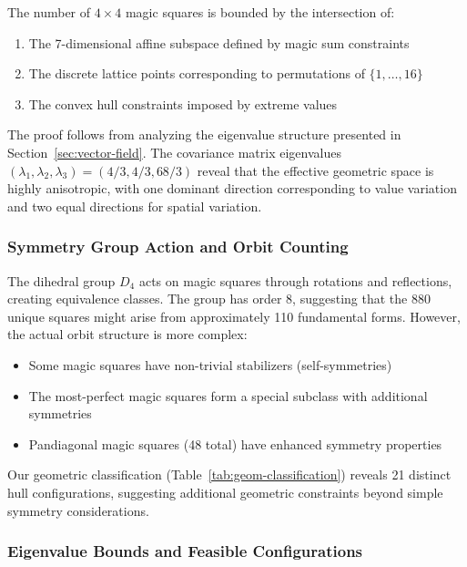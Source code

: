 \begin{theorem}
The number of $4 \times 4$ magic squares is bounded by the intersection of:
\begin{enumerate}
    \item The 7-dimensional affine subspace defined by magic sum constraints
    \item The discrete lattice points corresponding to permutations of $\{1, \ldots, 16\}$
    \item The convex hull constraints imposed by extreme values
\end{enumerate}
\end{theorem}

The proof follows from analyzing the eigenvalue structure presented in Section~\ref{sec:vector-field}. The covariance matrix eigenvalues $(\lambda_1, \lambda_2, \lambda_3) = (4/3, 4/3, 68/3)$ reveal that the effective geometric space is highly anisotropic, with one dominant direction corresponding to value variation and two equal directions for spatial variation.

\subsubsection{Symmetry Group Action and Orbit Counting}

The dihedral group $D_4$ acts on magic squares through rotations and reflections, creating equivalence classes. The group has order 8, suggesting that the 880 unique squares might arise from approximately 110 fundamental forms. However, the actual orbit structure is more complex:

\begin{itemize}
    \item Some magic squares have non-trivial stabilizers (self-symmetries)
    \item The most-perfect magic squares form a special subclass with additional symmetries
    \item Pandiagonal magic squares (48 total) have enhanced symmetry properties
\end{itemize}

Our geometric classification (Table~\ref{tab:geom-classification}) reveals 21 distinct hull configurations, suggesting additional geometric constraints beyond simple symmetry considerations.

\subsubsection{Eigenvalue Bounds and Feasible Configurations}


